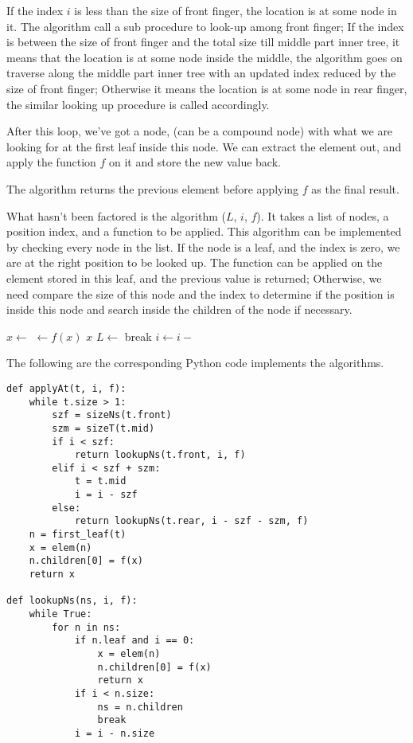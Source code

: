 \documentclass[UTF8]{article}
\begin{document}
If the index $i$ is less than the size of front finger, the location is at some
node in it. The algorithm call a sub procedure to look-up among front finger;
If the index is between the size of front finger and the total size till middle
part inner tree, it means that the location is at some node inside the middle,
the algorithm goes on traverse along the middle part inner tree with an updated
index reduced by the size of front finger; Otherwise
it means the location is at some node in rear finger, the similar looking up
procedure is called accordingly.

After this loop, we've got a node, (can be a compound node)
with what we are looking for at the first leaf inside this node. We can extract
the element out, and apply the function $f$ on it and store the new value back.

The algorithm returns the previous element before applying $f$ as the final result.

What hasn't been factored is the algorithm ($L$, $i$, $f$).
It takes a list of nodes, a position index, and a function to be applied. This
algorithm can be implemented by checking every node in the list. If the node
is a leaf, and the index is zero, we are at the right position to be looked up.
The function can be applied on the element stored in this leaf, and the previous
value is returned; Otherwise, we need compare the size of this node and
the index to determine if the position is inside this node and search inside the
children of the node if necessary.

\begin{algorithmic}
  \Loop
        \State $x \gets $ 
        \State {} $\gets f(x)$
        \State \Return $x$
      \EndIf
        \State $L \gets $ 
        \State break
      \EndIf
      \State $i \gets i - $ 
    \EndFor
  \EndLoop
\EndFunction
\end{algorithmic}

The following are the corresponding Python code implements the algorithms.

\lstset{language=Python}
\begin{lstlisting}
def applyAt(t, i, f):
    while t.size > 1:
        szf = sizeNs(t.front)
        szm = sizeT(t.mid)
        if i < szf:
            return lookupNs(t.front, i, f)
        elif i < szf + szm:
            t = t.mid
            i = i - szf
        else:
            return lookupNs(t.rear, i - szf - szm, f)
    n = first_leaf(t)
    x = elem(n)
    n.children[0] = f(x)
    return x

def lookupNs(ns, i, f):
    while True:
        for n in ns:
            if n.leaf and i == 0:
                x = elem(n)
                n.children[0] = f(x)
                return x
            if i < n.size:
                ns = n.children
                break
            i = i - n.size
\end{lstlisting}
\end{document}
